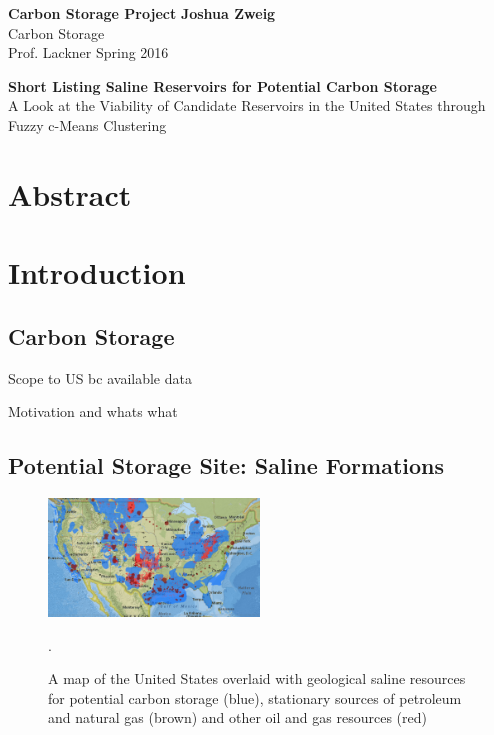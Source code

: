 \documentclass[a4paper, 12pt]{article}
\begin{document}
\noindent
\large\textbf{Carbon Storage Project} \hfill \textbf{Joshua Zweig} \\
\normalsize Carbon Storage \\
Prof. Lackner \hfill Spring 2016 \\

\begin{centering}
\textbf{Short Listing Saline Reservoirs for Potential Carbon Storage} \\
A Look at the Viability of Candidate Reservoirs in the United States through\\
Fuzzy c-Means Clustering\\
\end{centering}


\section*{Abstract}


\section{Introduction}
\subsection{Carbon Storage}
Scope to US bc available data


Motivation and whats what

\subsection{Potential Storage Site: Saline Formations}

\begin{figure} %
    \centering
    \includegraphics[width=0.5\textwidth]{saline_tight}
    \caption{\label{salinetight} A map of the United States overlaid with geological saline resources for potential carbon storage (blue), stationary sources of petroleum and natural gas (brown) and other oil and gas resources (red) \cite{atlas}}. 
\end{figure}
\end{document}
